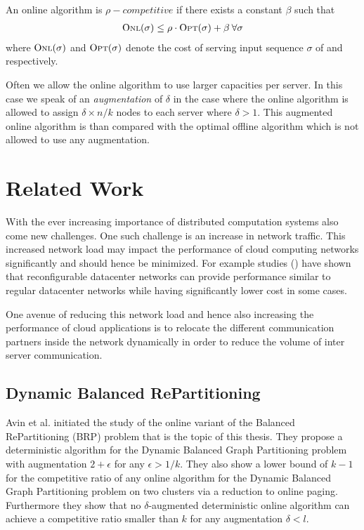\documentclass[a4paper,xcolor=dvipsnames, tikz, 12pt]{article}
\newcommand{\opt}{\text{O{\scriptsize PT}}}
\newcommand{\onl}{\text{O{\scriptsize NL}}}
\theoremstyle{definition}
\begin{document}
	An online algorithm \onl{} is $\rho-competitive$ if there exists a constant $\beta$ such that 
	\begin{align*}
	\onl{}(\sigma)\leq\rho\cdot \opt{}(\sigma)+\beta\:\forall \sigma
	\end{align*} 
	where $\onl{}(\sigma)$ and $\opt{}(\sigma)$ denote the cost of serving input sequence $\sigma$ of \onl{} and \opt{} respectively.
	
	Often we allow the online algorithm to use larger capacities per server. In this case we speak of an \textit{augmentation} of $\delta$ in the case where the online algorithm is allowed to assign $\delta\times n/k$ nodes to each server where $\delta>1$. This augmented online algorithm is than compared with the optimal offline algorithm \opt{} which is not allowed to use any augmentation.
	
	\section{Related Work}
	
	With the ever increasing importance of distributed computation systems also come new challenges. One such challenge is an increase in network traffic. This increased network load may impact the performance of cloud computing networks significantly and should hence be minimized. For example studies (\cite{Ghobadi2016, Hamedazimi2014}) have shown that reconfigurable datacenter networks can provide performance similar to regular datacenter networks while having significantly lower cost in some cases.
	
	One avenue of reducing this network load and hence also increasing the performance of cloud applications is to relocate the different communication partners inside the network dynamically in order to reduce the volume of inter server communication.
	
	
	\subsection{Dynamic Balanced RePartitioning}
	Avin et al.\cite{Avin2015} initiated the study of the online variant of the Balanced RePartitioning (BRP) problem that is the topic of this thesis. They propose a deterministic algorithm for the Dynamic Balanced Graph Partitioning problem with augmentation $2+\epsilon$ for any $\epsilon>1/k$. They also show a lower bound of $k-1$ for the competitive ratio of any online algorithm for the Dynamic Balanced Graph Partitioning problem on two clusters via a reduction to online paging. Furthermore they show that no $\delta$-augmented deterministic online algorithm can achieve a competitive ratio smaller than $k$ for any augmentation $\delta<l$. %
	
\end{document}
